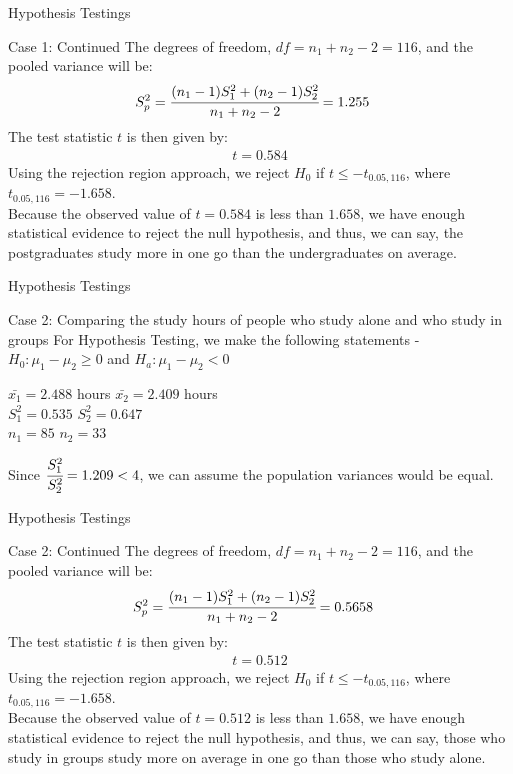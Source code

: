 \documentclass{beamer}
\begin{document}
\begin{frame}{Hypothesis Testings}
\begin{block}{Case 1: Continued}
The degrees of freedom, $df = n_1 + n_2 -2 = 116$, and the pooled variance will be:
 \begin{align}
     S_p^2 &= \cfrac{(n_1-1)S_1^2 + (n_2-1)S_2^2}{n_1+n_2-2} = 1.255
 \end{align}
The test statistic $t$ is then given by:
\begin{align}
      t = 0.584
 \end{align}
Using the rejection region approach, we reject $H_0$ if $t \leq -t_{0.05, 116}$, where $t_{0.05,116} = -1.658$.\\ 
 Because the observed value of $t=0.584$ is less than $1.658$, we have enough statistical evidence to reject the null hypothesis, and thus, we can say, the postgraduates study more in one go than the undergraduates on average.
\end{block}
\end{frame}

\begin{frame}{Hypothesis Testings}
\begin{block}{Case 2: Comparing the study hours of people who study alone and who study in groups}
For Hypothesis Testing, we make the following statements - $ H_0 : \mu_1 - \mu_2 \geq 0$ and $H_a : \mu_1 - \mu_2 < 0$
\par
\begin{center}
    $\bar{x_1} = 2.488$ hours \quad $\bar{x_2} = 2.409$ hours \\
    $S^2_1 = 0.535$ \quad
    $S^2_2 = 0.647$ \\
    $n_1 = 85$ \quad
    $n_2 = 33$
\end{center}
Since $\cfrac{S_1^2}{S_2^2} = 1.209 < 4$, we can assume the population variances would be equal.
\end{block}
\end{frame}

\begin{frame}{Hypothesis Testings}
\begin{block}{Case 2: Continued}
The degrees of freedom, $df = n_1 + n_2 -2 = 116$, and the pooled variance will be:
 \begin{align}
     S_p^2 &= \cfrac{(n_1-1)S_1^2 + (n_2-1)S_2^2}{n_1+n_2-2} = 0.5658
 \end{align}
The test statistic $t$ is then given by:
\begin{align}
      t = 0.512
 \end{align}
Using the rejection region approach, we reject $H_0$ if $t \leq -t_{0.05, 116}$, where $t_{0.05,116} = -1.658$.\\ 
 Because the observed value of $t=0.512$ is less than $1.658$, we have enough statistical evidence to reject the null hypothesis, and thus, we can say, those who study in groups study more on average in one go than those who study alone.
\end{block}
\end{frame}
\end{document}
